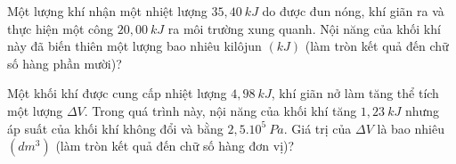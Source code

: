 \begin{ex}
Một lượng khí nhận một nhiệt lượng $35,40\ kJ$ do được đun nóng, khí giãn ra và thực hiện một công $20,00\ kJ$ ra môi trường xung quanh. Nội năng của khối khí này đã biến thiên một lượng bao nhiêu kilôjun $(kJ)$ (làm tròn kết quả đến chữ số hàng phần mười)?
\end{ex}

\begin{ex}
	 Một khối khí được cung cấp nhiệt lượng $4,98\ kJ$, khí giãn nở làm tăng thể tích một lượng $\Delta V$. Trong quá trình này, nội năng của khối khí tăng $1,23\ kJ$ nhưng áp suất của khối khí không đổi và bằng $2,5.10^5\ Pa$. Giá trị của $\Delta V$ là bao nhiêu $(dm^3)$ (làm tròn kết quả đến chữ số hàng đơn vị)?
\end{ex}

